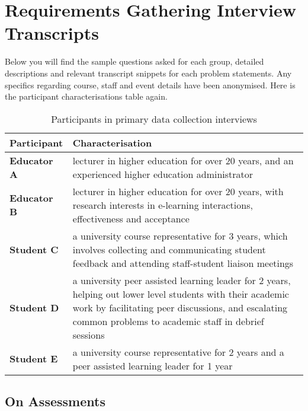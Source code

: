 
\chapter{Requirements Gathering Interview Transcripts}

Below you will find the sample questions asked for each group, detailed descriptions and relevant transcript 
snippets for each problem statements. 
Any specifics regarding course, staff and event details have been anonymised.
Here is the participant characterisations table again.

\begin{table}[!h] 
    \caption{Participants in primary data collection interviews}
    \centering
    \begin{tabularx}{\textwidth}{>{\bfseries}lX}
        Participant & Characterisation\\
        \toprule
        Educator A & lecturer in higher education for over 20 years, and an experienced higher education 
        administrator\\\midrule
        Educator B & lecturer in higher education for over 20 years, with research interests 
        in e-learning interactions, effectiveness and acceptance\\\midrule
        Student C & a university course representative for 3 years, which involves collecting and 
        communicating student feedback and attending staff-student liaison meetings \\\midrule
        Student D & a university peer assisted learning leader for 2 years, helping out lower level 
        students with their academic work by facilitating peer discussions, and escalating common problems
        to academic staff in debrief sessions\\\midrule
        Student E & a university course representative for 2 years and a peer assisted learning leader 
        for 1 year\\\bottomrule
    \end{tabularx}
\end{table}

\section{On Assessments}

